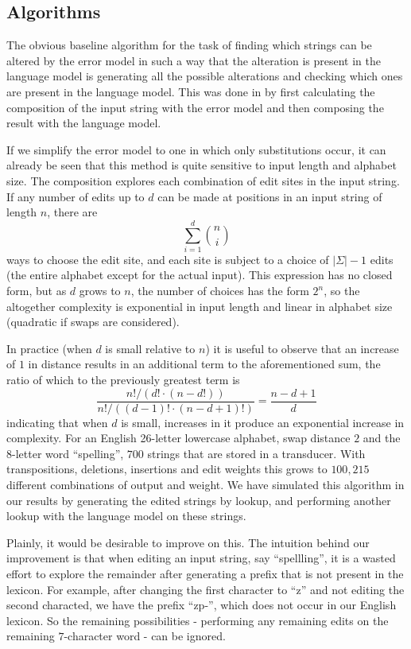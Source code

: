 \documentclass[11pt]{article}
\begin{document}
\subsection{Algorithms}
\label{sec:algorithms}
The obvious baseline algorithm for the task of finding which strings can be
altered by the error model in such a way that the alteration is present in the
language model is generating all the possible alterations and checking which
ones are present in the language model. This was done in 
by first calculating the composition of the input string with the error
model and then composing the result with the language model.

If we simplify the error model to one in which only substitutions occur, it can
already be seen that this method is quite sensitive to input length and
alphabet size. The composition explores each combination of edit sites in the
input string. If any number of edits up to $d$ can be made at positions in an
input string of length $n$, there are
\begin{displaymath}
\sum_{i=1}^{d} {n \choose i}
\end{displaymath}
ways to choose the edit site, and each site is subject to a choice of
$|\Sigma| - 1$ edits (the
entire alphabet except for the actual input). This expression has no closed
form, but as $d$ grows to $n$, the number of choices has the form $2^n$,
so the altogether complexity is exponential in input length and linear
in alphabet size (quadratic if swaps are considered).

In practice
(when $d$ is small relative to $n$) it is useful to observe that an
increase of $1$ in distance results
in an additional term to the aforementioned sum,
the ratio of which to the previously greatest term is
\begin{displaymath}
\frac{n!/(d!\cdot(n-d!))}{n!/((d-1)!\cdot(n-d+1)!)} = \frac{n-d+1}{d}
\end{displaymath}
indicating that when $d$ is small, increases in it produce an
exponential increase in complexity.
For an English 26-letter lowercase alphabet, swap
distance $2$ and the $8$-letter word ``spelling'', $700$ strings that are
stored in a transducer. With transpositions, deletions, insertions and edit
weights this grows to $100,215$ different combinations of output and weight. We
have simulated this algorithm in our results by generating the edited strings
by lookup, and performing another lookup with the language model on these
strings.

Plainly, it would be desirable to improve on this. The intuition behind our
improvement is that when editing an input string, say ``spellling'', it is a
wasted effort to explore the remainder after generating a prefix that is not
present in the lexicon. For example, after changing the first character to ``z''
and not editing the second characted, we have the prefix \mbox{``zp-''}, which does
not occur in our English lexicon. So the remaining possibilities - performing
any remaining edits on the remaining $7$-character word - can be ignored.
\end{document}
